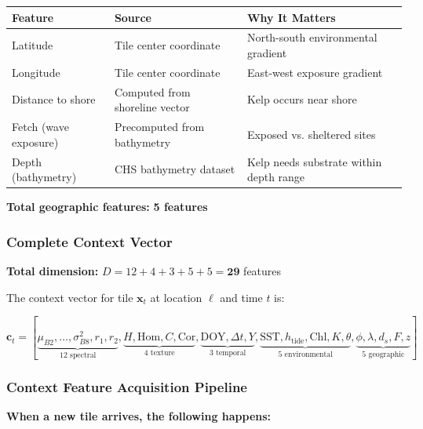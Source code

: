 \documentclass[11pt]{article}
\begin{document}
\begin{center}
\begin{tabular}{p{3.5cm}p{4cm}p{4.5cm}}
\toprule
\textbf{Feature} & \textbf{Source} & \textbf{Why It Matters} \\
\midrule
Latitude & Tile center coordinate & North-south environmental gradient \\
Longitude & Tile center coordinate & East-west exposure gradient \\
Distance to shore & Computed from shoreline vector & Kelp occurs near shore \\
Fetch (wave exposure) & Precomputed from bathymetry & Exposed vs. sheltered sites \\
Depth (bathymetry) & CHS bathymetry dataset & Kelp needs substrate within depth range \\
\bottomrule
\end{tabular}
\end{center}

\textbf{Total geographic features:} \textbf{5 features}

\subsubsection{Complete Context Vector}

\textbf{Total dimension:} $D = 12 + 4 + 3 + 5 + 5 = \mathbf{29}$ features

The context vector for tile $\mathbf{x}_t$ at location $\ell$ and time $t$ is:

\[
\mathbf{c}_t = [\underbrace{\mu_{B2}, \ldots, \sigma^2_{B8}, r_1, r_2}_{\text{12 spectral}}, \underbrace{H, \text{Hom}, C, \text{Cor}}_{\text{4 texture}}, \underbrace{\text{DOY}, \Delta t, Y}_{\text{3 temporal}}, \underbrace{\text{SST}, h_{\text{tide}}, \text{Chl}, K, \theta}_{\text{5 environmental}}, \underbrace{\phi, \lambda, d_s, F, z}_{\text{5 geographic}}]
\]

\subsubsection{Context Feature Acquisition Pipeline}

\textbf{When a new tile arrives, the following happens:}
\end{document}
